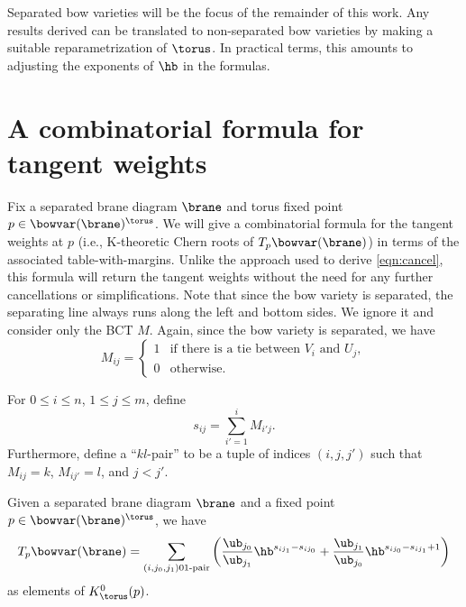 Separated bow varieties will be the focus of the remainder of this work. Any results derived can be translated to non-separated bow varieties by making a suitable reparametrization of $\torus$. In practical terms, this amounts to adjusting the exponents of $\hb$ in the formulas.


\section{A combinatorial formula for tangent weights} \label{sec:bct_weights}
Fix a separated brane diagram $\brane$ and torus fixed point $p\in\bowvar(\brane)^\torus$. We will give a combinatorial formula for the tangent weights at $p$ (i.e., K-theoretic Chern roots of $T_p\bowvar(\brane)$) in terms of the associated table-with-margins. Unlike the approach used to derive \eqref{eqn:cancel}, this formula will return the tangent weights without the need for any further cancellations or simplifications. Note that since the bow variety is separated, the separating line always runs along the left and bottom sides. We ignore it and consider only the BCT $M$. Again, since the bow variety is separated, we have
\[
M_{ij} = \begin{cases}
1 & \text{if there is a tie between }V_i\text{ and }U_j, \\
0 & \text{otherwise}. \end{cases}
\]

\begin{Definition} \label{def:pairs}
For $0\leq i \leq n$, $1 \leq j \leq m$, define
\[
s_{ij} = \sum_{i' = 1}^i M_{i' j}.
\]
Furthermore, define a ``$kl$-pair'' to be a tuple of indices $(i, j, j')$ such that $M_{i j} = k$, $M_{i j'} = l$, and $j < j'$.
\end{Definition}

\begin{Theorem} \label{thm:weights}
Given a separated brane diagram $\brane$ and a fixed point $p\in\bowvar(\brane)^\torus$, we have
\begin{equation*}
T_p\bowvar(\brane) = \sum_{(i, j_0, j_1)\text{$01$-pair}} \left(
 \frac{\ub_{j_0}}{\ub_{j_1}}\hb^{s_{i j_1}-s_{i j_0}} + \frac{\ub_{j_1}}{\ub_{j_0}}\hb^{s_{i j_0}-s_{i j_1}+1} \right)
\end{equation*}
as elements of $K^0_\torus(p)$.
\end{Theorem}

